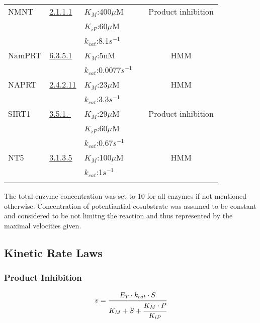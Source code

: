 \documentclass[a4paper,10pt]{article} \usepackage[utf8x]{inputenc}
\begin{document}
\begin{longtable}{p{3cm}p{2cm}p{3cm}cc}
    \\ \hline
NMNT & \href{http://www.chem.qmul.ac.uk/iubmb/enzyme/EC2/1/1/1.html}{2.1.1.1}
&$K_M$:400$\mu$M  & \cite{Aksoy1994} & Product inhibition\\
& & $K_{iP}$:60$\mu$M  & & 
    \\
    & & $k_{cat}$:8.1$s^{-1}$  & \cite{Alston1988}& 
    \\  \hline
NamPRT & \href{http://www.chem.qmul.ac.uk/iubmb/enzyme/EC6/3/5/1.html}{6.3.5.1}
&$K_M$:5nM  & \cite{Burgos2008} & HMM\\
    & & $k_{cat}$:0.0077$s^{-1}$  & & 
    \\  \hline
    NAPRT &
       \href{http://www.chem.qmul.ac.uk/iubmb/enzyme/EC2/4/2/11.html}{2.4.2.11}
    &$K_M$:23$\mu$M  & \cite{Hanna1983} & HMM\\
    & & $k_{cat}$:3.3$s^{-1}$  & & 
    \\  \hline
    SIRT1 &
    \href{http://www.chem.qmul.ac.uk/iubmb/enzyme/EC3/5/1/index.html}{3.5.1.-}
    &$K_M$:29$\mu$M  & \cite{Borra2004} & Product inhibition\\
    & & $K_{iP}$:60$\mu$M  & & 
    \\
    & & $k_{cat}$:0.67$s^{-1}$  & & 
    \\  \hline
    NT5 &
    \href{http://www.chem.qmul.ac.uk/iubmb/enzyme/EC3/1/3/5.html}{3.1.3.5}
    &$K_M$:100$\mu$M  & \cite{} & HMM \\
    & & $k_{cat}$:1$s^{-1}$ 
    & & \\  \hline   
  \bottomrule
  \label{tab:kinetic}
\end{longtable}

The total enzyme concentration was set to 10 for all enzymes if not mentioned
otherwise. Concentration of potentiantial cosubstrate was assumed to be constant
and considered to be not limitng the reaction and thus represented by the
maximal velocities given.

\subsection*{Kinetic Rate Laws}


\subsubsection*{Product Inhibition}
\begin{equation}
v=\cfrac{E_T\cdot k_{cat}\cdot S}{K_M + S + \cfrac{K_M\cdot P}{K_{iP}} }
\end{equation}
\end{document}
